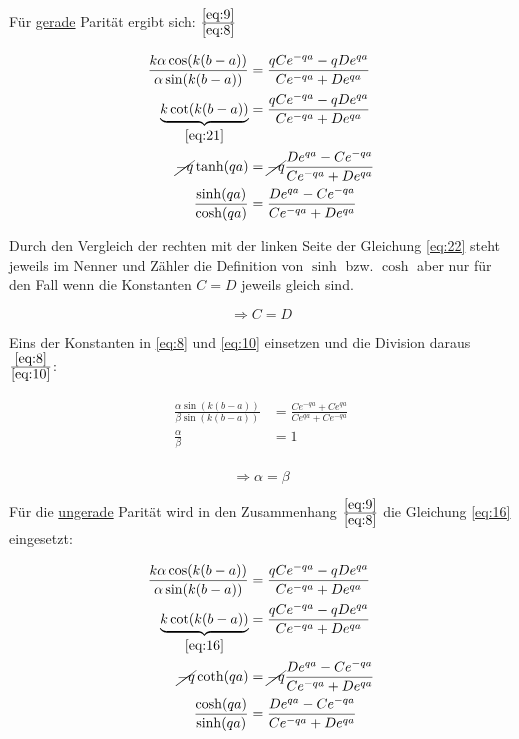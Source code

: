 Für \underline{gerade} Parität ergibt sich:
\(\frac{\eqref{eq:9}}{\eqref{eq:8}}\)

\begin{align}  
  \frac{k\alpha\cos(k(b-a))}{\alpha\sin(k(b-a))} &= \frac{qCe^{-qa}-qDe^{qa}}{Ce^{-qa}+De^{qa}}\\
\underbrace{k\cot(k(b-a))}_{\eqref{eq:21}} &= \frac{qCe^{-qa}-qDe^{qa}}{Ce^{-qa}+De^{qa}}\\
\cancel{-q} \tanh(qa) &=\cancel{ -q} \frac{De^{qa}-Ce^{-qa}}{Ce^{-qa}+De^{qa}}\\
\frac{\sinh(qa)}{\cosh(qa)} &= \frac{De^{qa}-Ce^{-qa}}{Ce^{-qa}+De^{qa}}\label{eq:22}
\end{align}

Durch den Vergleich der rechten mit der linken Seite der Gleichung \eqref{eq:22} steht jeweils im Nenner und Zähler die Definition von \(\sinh\) bzw. \(\cosh\) aber nur für den Fall wenn die Konstanten \(C=D\) jeweils gleich sind.

\[\Rightarrow C=D\]

Eins der Konstanten in \eqref{eq:8} und  \eqref{eq:10} einsetzen und die Division daraus \(\frac{\eqref{eq:8}}{\eqref{eq:10}}\):

\begin{align}
  \label{eq:23}
\frac{\alpha\sin(k(b-a))}{\beta\sin(k(b-a))} &= \frac{Ce^{-qa}+Ce^{qa}}{ Ce^{qa}+Ce^{-qa}}\\
\frac{\alpha}{\beta} &= 1\\
\end{align}

\begin{equation}
  \label{eq:24}
 \Rightarrow  \alpha = \beta
\end{equation}

Für die \underline{ungerade} Parität wird in den Zusammenhang \(\frac{\eqref{eq:9}}{\eqref{eq:8}}\) die Gleichung \eqref{eq:16} eingesetzt:

\begin{align}  
  \frac{k\alpha\cos(k(b-a))}{\alpha\sin(k(b-a))} &= \frac{qCe^{-qa}-qDe^{qa}}{Ce^{-qa}+De^{qa}}\\
\underbrace{k\cot(k(b-a))}_{\eqref{eq:16}} &= \frac{qCe^{-qa}-qDe^{qa}}{Ce^{-qa}+De^{qa}}\\
\cancel{-q} \coth(qa) &=\cancel{ -q} \frac{De^{qa}-Ce^{-qa}}{Ce^{-qa}+De^{qa}}\\
\frac{\cosh(qa)}{\sinh(qa)} &= \frac{De^{qa}-Ce^{-qa}}{Ce^{-qa}+De^{qa}}\label{eq:22}
\end{align}

